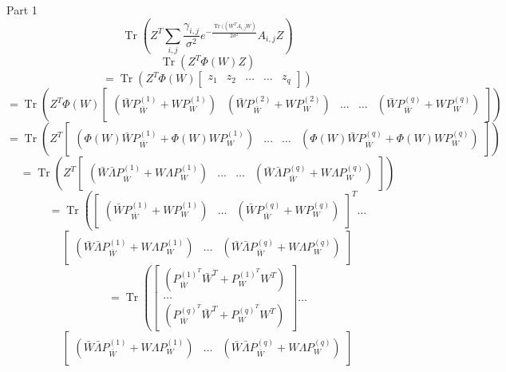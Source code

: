 \documentclass{article}
\newcommand{\nobracket}{}
\newcommand{\tmop}[1]{\ensuremath{\operatorname{#1}}}
\begin{document}
Part 1
\[ \tmop{Tr} \left( Z^T \sum_{i, j} \frac{\gamma_{i, j}}{\sigma^2} e^{-
   \frac{\tmop{Tr} ( ( W^T A_{i, j} W \nobracket)}{2 \sigma^2}} A_{i, j} Z
   \right) \]
\[ \tmop{Tr} ( Z^T \Phi ( W) Z) \]
\[ = \tmop{Tr} \left( Z^T \Phi ( W) \left[ \begin{array}{lllll}
     z_1 & z_2 & \ldots & \ldots & z_q
   \end{array} \right] \right) \]
\[ = \tmop{Tr} \left( Z^T \Phi ( W) \left[ \begin{array}{lllll}
     ( \bar{W} P_{\bar{W}}^{( 1)} + W P_W^{( 1)}) & ( \bar{W} P_{\bar{W}}^{(
     2)} + W P_W^{( 2)}) & \ldots & \ldots & ( \bar{W} P_{\bar{W}}^{( q)} + W
     P_W^{( q)})
   \end{array} \right] \right) \]
\[ = \tmop{Tr} \left( Z^T \left[ \begin{array}{llll}
     ( \Phi ( W) \bar{W} P_{\bar{W}}^{( 1)} + \Phi ( W) W P_W^{( 1)}) & \ldots
     & \ldots & ( \Phi ( W) \bar{W} P_{\bar{W}}^{( q)} + \Phi ( W) W P_W^{(
     q)})
   \end{array} \right] \right) \]
\[ = \tmop{Tr} \left( Z^T \left[ \begin{array}{llll}
     ( \bar{W} \bar{\Lambda} P_{\bar{W}}^{( 1)} + W \Lambda P_W^{( 1)}) &
     \ldots & \ldots & ( \bar{W} \bar{\Lambda} P_{\bar{W}}^{( q)} + W \Lambda
     P_W^{( q)})
   \end{array} \right] \right) \]
\[ = \tmop{Tr} \left( \left[ \begin{array}{lll}
     ( \bar{W} P_{\bar{W}}^{( 1)} + W P_W^{( 1)}) & \ldots & ( \bar{W}
     P_{\bar{W}}^{( q)} + W P_W^{( q)})
   \end{array} \right]^T \right. \ldots \]
\[ \left[ \begin{array}{lll}
     ( \bar{W} \bar{\Lambda} P_{\bar{W}}^{( 1)} + W \Lambda P_W^{( 1)}) &
     \ldots & ( \bar{W} \bar{\Lambda} P_{\bar{W}}^{( q)} + W \Lambda P_W^{(
     q)})
   \end{array} \right] \]
\[  \]
\[ = \tmop{Tr} \left( \left[ \begin{array}{l}
     ( P_{\bar{W}}^{( 1)^T} \bar{W}^T + P_W^{( 1)^T} W^T)\\
     \ldots\\
     ( P_{\bar{W}}^{( q)^T} \bar{W} ^T + P_W^{( q)^T} W^T)
   \end{array} \right] \right. \ldots \]
\[ \left[ \begin{array}{lll}
     ( \bar{W} \bar{\Lambda} P_{\bar{W}}^{( 1)} + W \Lambda P_W^{( 1)}) &
     \ldots & ( \bar{W} \bar{\Lambda} P_{\bar{W}}^{( q)} + W \Lambda P_W^{(
     q)})
   \end{array} \right] \]
\end{document}

